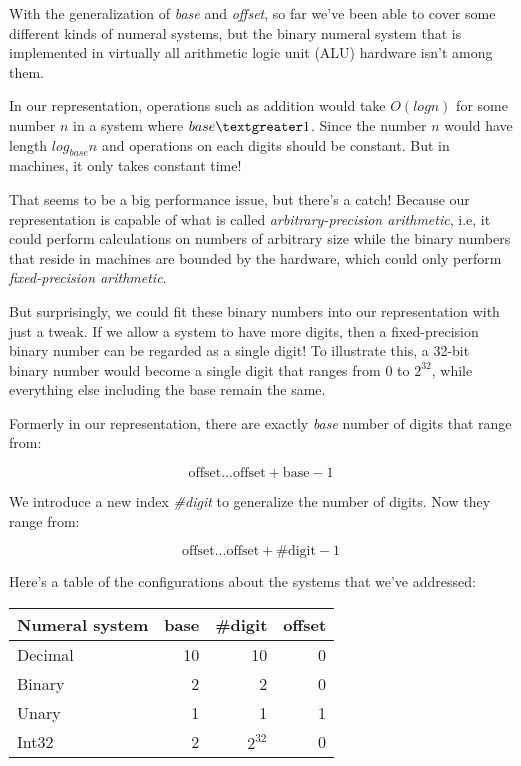 \documentclass[12pt, a4paper]{article}
\begin{document}
With the generalization of \textit{base} and \textit{offset}, so far we've been
able to cover some different kinds of numeral systems, but the binary numeral
system that is implemented in virtually all arithmetic logic unit (ALU) hardware
isn't among them.

In our representation, operations such as addition would take $ O(log{}n)$ for some
number $ n $ in a system where $ base \textgreater 1 $. Since the number $ n $
would have length $ log_{base} n $ and operations on each digits should be constant.
But in machines, it only takes constant time!

That seems to be a big performance issue, but there's a catch! Because our
representation is capable of what is called \textit{arbitrary-precision arithmetic},
i.e, it could perform calculations on numbers of arbitrary size while the binary
numbers that reside in machines are bounded by the hardware, which could only
perform \textit{fixed-precision arithmetic}.

But surprisingly, we could fit these binary numbers into our representation with
just a tweak. If we allow a system to have more digits, then a fixed-precision
binary number can be regarded as a single digit! To illustrate this, a 32-bit
binary number would become a single digit that ranges from $ 0 $ to $ 2^{32} $,
while everything else including the base remain the same.

Formerly in our representation, there are exactly \textit{base} number of digits
that range from:

$$
    \text{offset}  ...  \text{offset} + \text{base} - 1
$$

We introduce a new index \textit{\#digit} to generalize the number of digits.
Now they range from:

$$
    \text{offset}  ...  \text{offset} + \text{\#digit} - 1
$$

Here's a table of the configurations about the systems that we've addressed:

\begin{center}
    \begin{tabular}{l*{3}{r}}
    Numeral system      & base  & \#digit    & offset    \\
    \hline
    Decimal             & 10    & 10        & 0         \\
    Binary              & 2     & 2         & 0         \\
    Unary               & 1     & 1         & 1         \\
    Int32               & 2     & $ 2^{32} $ & 0        \\
    \end{tabular}
\end{center}
\end{document}
